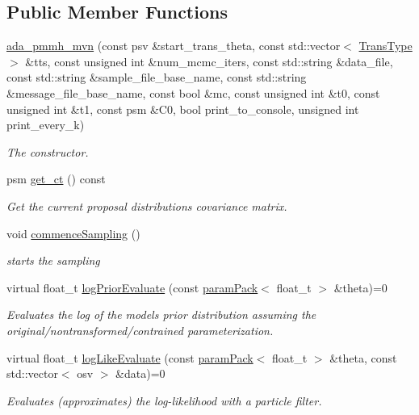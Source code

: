 \subsection*{Public Member Functions}
\begin{DoxyCompactItemize}
\item 
\hyperlink{classada__pmmh__mvn_a749d2c42d1c5741edeb55b641dca9625}{ada\+\_\+pmmh\+\_\+mvn} (const psv \&start\+\_\+trans\+\_\+theta, const std\+::vector$<$ \hyperlink{param__transforms_8h_acee593b112f4fc85f850631b9c6aaae9}{Trans\+Type} $>$ \&tts, const unsigned int \&num\+\_\+mcmc\+\_\+iters, const std\+::string \&data\+\_\+file, const std\+::string \&sample\+\_\+file\+\_\+base\+\_\+name, const std\+::string \&message\+\_\+file\+\_\+base\+\_\+name, const bool \&mc, const unsigned int \&t0, const unsigned int \&t1, const psm \&C0, bool print\+\_\+to\+\_\+console, unsigned int print\+\_\+every\+\_\+k)
\begin{DoxyCompactList}\small\item\em The constructor. \end{DoxyCompactList}\item 
psm \hyperlink{classada__pmmh__mvn_a06930a79f4d2a62aa0cf24528c77e5a7}{get\+\_\+ct} () const
\begin{DoxyCompactList}\small\item\em Get the current proposal distribution\textquotesingle{}s covariance matrix. \end{DoxyCompactList}\item 
void \hyperlink{classada__pmmh__mvn_a891d79acc39485cdd9104bdf120bec7a}{commence\+Sampling} ()
\begin{DoxyCompactList}\small\item\em starts the sampling \end{DoxyCompactList}\item 
virtual float\+\_\+t \hyperlink{classada__pmmh__mvn_af946eae70a63045515ed7830c35106dc}{log\+Prior\+Evaluate} (const \hyperlink{classparamPack}{param\+Pack}$<$ float\+\_\+t $>$ \&theta)=0
\begin{DoxyCompactList}\small\item\em Evaluates the log of the model\textquotesingle{}s prior distribution assuming the original/nontransformed/contrained parameterization. \end{DoxyCompactList}\item 
virtual float\+\_\+t \hyperlink{classada__pmmh__mvn_a82d43085173fd0ed33ee42de9be48b77}{log\+Like\+Evaluate} (const \hyperlink{classparamPack}{param\+Pack}$<$ float\+\_\+t $>$ \&theta, const std\+::vector$<$ osv $>$ \&data)=0
\begin{DoxyCompactList}\small\item\em Evaluates (approximates) the log-\/likelihood with a particle filter. \end{DoxyCompactList}\end{DoxyCompactItemize}

